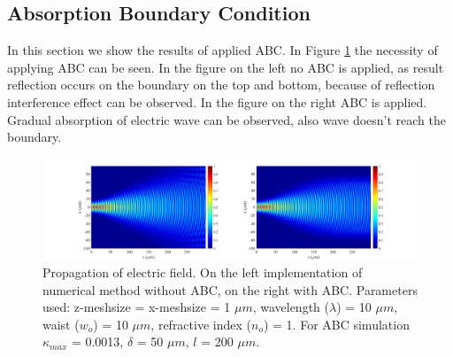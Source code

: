 \documentclass[a4paper]{article}
\begin{document}
	\subsection{Absorption Boundary Condition}
	In this section we show the results of applied ABC. In Figure \ref{fig:Absorption2} the necessity of applying ABC can be seen. In the figure on the left no ABC is applied, as result reflection occurs on the boundary on the top and bottom, because of reflection interference effect can be observed. In the figure on the right ABC is applied. Gradual absorption of electric wave can be observed, also wave doesn't reach the boundary.
	
	\begin{figure}[h!]
		\hspace{-30mm}
		\includegraphics[width=1.5\textwidth]{N3.jpg}
		\caption{\label{fig:Absorption2}Propagation of electric field. On the left implementation of numerical method without ABC, on the right with ABC. Parameters used: z-meshsize = x-meshsize  = 1 $\mu m$, wavelength ($\lambda$) = 10 $\mu m$, waist ($w_o$) = 10 $\mu m$, refractive index ($n_o$) = 1. For ABC simulation $\kappa_{max}$ = 0.0013, $\delta$ =  50 $\mu m$, $l$ = 200 $\mu m$.}
	\end{figure}
\end{document}
